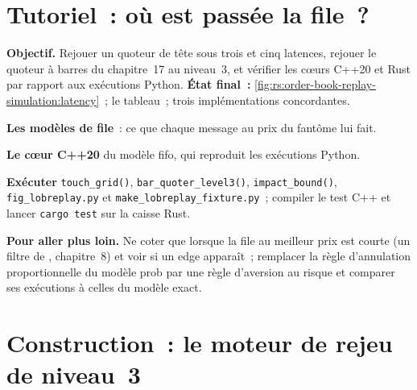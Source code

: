 \section{Tutoriel~: où est passée la file~?}\label{tut:rs:order-book-replay-simulation:tut}

\begin{tutorial}
\textbf{Objectif.} Rejouer un quoteur de tête sous trois  et cinq latences, rejouer le quoteur à barres du chapitre~17 au niveau~3, et vérifier les cœurs C++20 et Rust par rapport aux
exécutions Python. \textbf{État final~:} \cref{fig:rs:order-book-replay-simulation:latency}~; le tableau~; trois implémentations concordantes.
\begin{tutsteps}
\item \textbf{Les modèles de file}~: ce que chaque message au prix du fantôme lui fait.
\label{lst:rs:order-book-replay-simulation:models}
\item \textbf{Le cœur C++20} du modèle fifo, qui reproduit les exécutions Python.
\label{lst:rs:order-book-replay-simulation:cpp}
\item \textbf{Exécuter} \texttt{touch\_grid()}, \texttt{bar\_quoter\_level3()}, \texttt{impact\_bound()}, \texttt{fig\_lobreplay.py} et \texttt{make\_lobreplay\_fixture.py}~; compiler
le test C++ et lancer \texttt{cargo test} sur la caisse Rust.
\end{tutsteps}
\textbf{Pour aller plus loin.} Ne coter que lorsque la file au meilleur prix est courte (un filtre de , chapitre~8) et voir si un edge apparaît~; remplacer
la règle d'annulation proportionnelle du modèle prob par une règle d'aversion au risque et comparer ses exécutions à celles du modèle exact.
\end{tutorial}

\section{Construction~: le moteur de rejeu de niveau~3}\label{bld:rs:order-book-replay-simulation:lobreplay}

